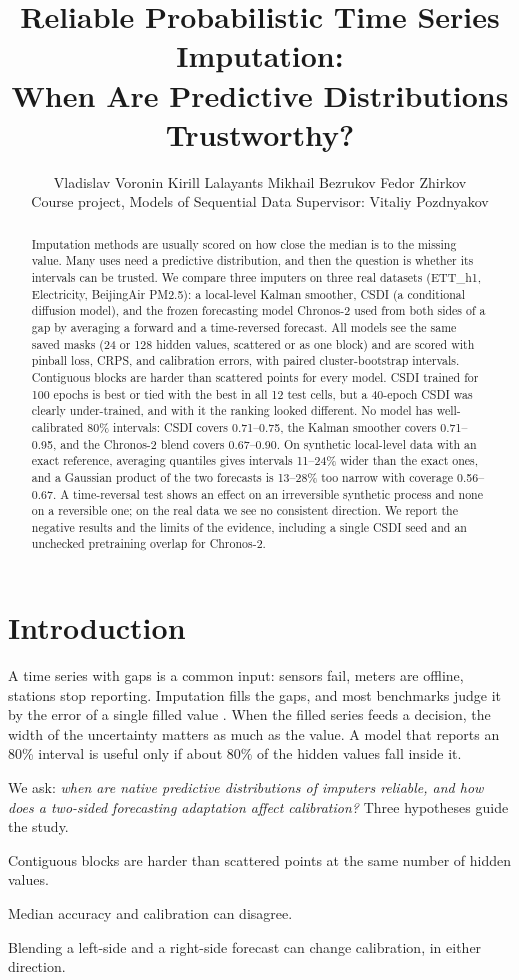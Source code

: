 \documentclass[10pt,twocolumn]{article}
\title{\vspace{-0.4em}\textbf{Reliable Probabilistic Time Series Imputation:\\ When Are Predictive Distributions Trustworthy?}\vspace{-0.3em}}
\author{Vladislav Voronin \quad Kirill Lalayants \quad Mikhail Bezrukov \quad Fedor Zhirkov\\[2pt]
\small Course project, Models of Sequential Data \quad Supervisor: Vitaliy Pozdnyakov}
\date{\vspace{-1.2em}}
\newcommand{\Chr}{Chronos-2}
\begin{document}
\maketitle

\begin{abstract}
\noindent
Imputation methods are usually scored on how close the median is to the missing value. Many uses need a predictive distribution, and then the question is whether its intervals can be trusted. We compare three imputers on three real datasets (ETT\_h1, Electricity, BeijingAir PM2.5): a local-level Kalman smoother, CSDI (a conditional diffusion model), and the frozen forecasting model \Chr{} used from both sides of a gap by averaging a forward and a time-reversed forecast. All models see the same saved masks (24 or 128 hidden values, scattered or as one block) and are scored with pinball loss, CRPS, and calibration errors, with paired cluster-bootstrap intervals. Contiguous blocks are harder than scattered points for every model. CSDI trained for 100 epochs is best or tied with the best in all 12 test cells, but a 40-epoch CSDI was clearly under-trained, and with it the ranking looked different. No model has well-calibrated 80\% intervals: CSDI covers 0.71--0.75, the Kalman smoother covers 0.71--0.95, and the \Chr{} blend covers 0.67--0.90. On synthetic local-level data with an exact reference, averaging quantiles gives intervals 11--24\% wider than the exact ones, and a Gaussian product of the two forecasts is 13--28\% too narrow with coverage 0.56--0.67. A time-reversal test shows an effect on an irreversible synthetic process and none on a reversible one; on the real data we see no consistent direction. We report the negative results and the limits of the evidence, including a single CSDI seed and an unchecked pretraining overlap for \Chr{}.
\end{abstract}

\section{Introduction}
A time series with gaps is a common input: sensors fail, meters are offline, stations stop reporting. Imputation fills the gaps, and most benchmarks judge it by the error of a single filled value \citep{du2024tsibench}. When the filled series feeds a decision, the width of the uncertainty matters as much as the value. A model that reports an 80\% interval is useful only if about 80\% of the hidden values fall inside it.

We ask: \emph{when are native predictive distributions of imputers reliable, and how does a two-sided forecasting adaptation affect calibration?} Three hypotheses guide the study.
\begin{description}[leftmargin=0pt,labelindent=0pt,itemsep=1pt]
\item[H1] Contiguous blocks are harder than scattered points at the same number of hidden values.
\item[H2] Median accuracy and calibration can disagree.
\item[H3] Blending a left-side and a right-side forecast can change calibration, in either direction.
\end{description}
\end{document}
